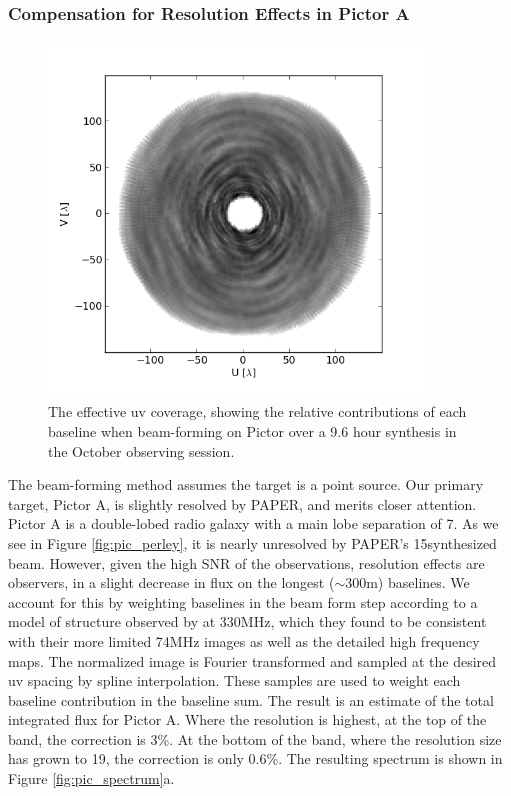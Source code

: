 \documentclass[preprint]{aastex}
\begin{document}
\subsubsection{Compensation for Resolution Effects in Pictor A}

\begin{figure}
\includegraphics[width=0.9\textwidth]{plots/PicA_Oct2011_uv_coverage.png}
\caption{The effective uv coverage, showing the relative contributions of each baseline when beam-forming on Pictor over a 9.6 hour synthesis in the October observing session. \label{fig:uv_coverage}}
\end{figure}

The beam-forming method assumes the target is a point source. Our primary
target, Pictor A, is slightly resolved by PAPER, and merits closer attention.
Pictor A is a double-lobed radio galaxy with a main lobe separation of
7\arcmin. As we see in Figure \ref{fig:pic_perley}, it is nearly unresolved by
PAPER's 15\arcmin synthesized beam. However, given the high SNR of the
observations, resolution effects are observers, in a slight decrease in flux on
the longest ($\sim$300m) baselines. We account for this by weighting baselines
in the beam form step according to a model of structure observed by
\citet{Perley:1997p9312} at 330MHz, which they found to be consistent with
their more limited 74MHz images as well as the detailed high frequency maps.
The normalized image is Fourier transformed and sampled at the desired uv
spacing by spline interpolation. These samples are used to weight each baseline
contribution in the baseline sum. The result is an estimate of the total
integrated flux for Pictor A. Where the resolution is highest, at the top of
the band, the correction is 3\%. At the bottom of the band, where the
resolution size has grown to 19\arcmin, the correction is only 0.6\%. The
resulting spectrum is shown in Figure \ref{fig:pic_spectrum}a.
\end{document}
